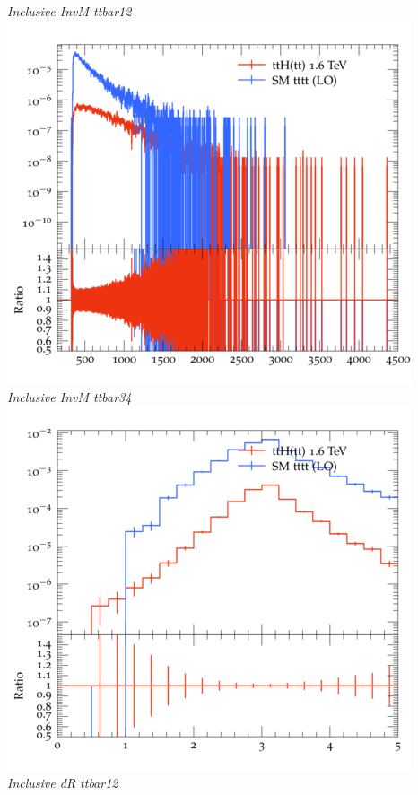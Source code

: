 \documentclass{beamer}
\begin{document}
\begin{frame}
\begin{columns}
\textit{\small Inclusive InvM ttbar12}
\includegraphics[width=\textwidth]{../plots/ttH_1600/tttt_ttH/Inclusive_InvM_ttbar34.png}\\
\textit{\small Inclusive InvM ttbar34}
\includegraphics[width=\textwidth]{../plots/ttH_1600/tttt_ttH/Inclusive_dR_ttbar12.png}\\
\textit{\small Inclusive dR ttbar12}
\end{columns}
\end{frame}
\end{document}
